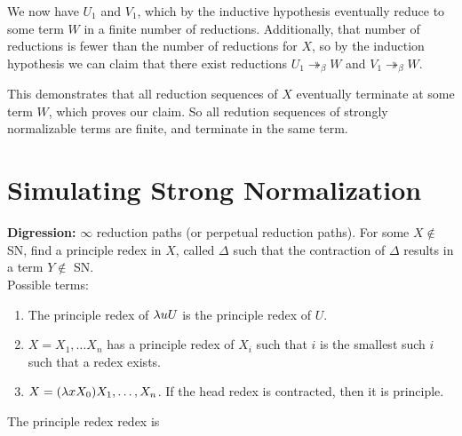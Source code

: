We now have $U_1$ and $V_1$, which by the inductive hypothesis eventually reduce to some term $W$ in a finite number of reductions. Additionally, that number of reductions is fewer than the number of reductions for $X$, so by the induction hypothesis we can claim that there exist reductions $U_1 \twoheadrightarrow_\beta W$ and $V_1 \twoheadrightarrow_\beta W$.

\begin{center}
\end{center}

This demonstrates that all reduction sequences of $X$ eventually terminate at some term $W$, which proves our claim. So all redution sequences of strongly normalizable terms are finite, and terminate in the same term.

\section{Simulating Strong Normalization}

\textbf{Digression:} $\infty$ reduction paths (or perpetual reduction paths). For some $X \not\in$ SN, find a principle redex in $X$, called $\Delta$ such that the contraction of $\Delta$ results in a term $Y \not\in$ SN.\\

Possible terms:
\begin{enumerate}
  \item The principle redex of $\lambda uU$ is the principle redex of $U$.
  \item $X = X_1,\ldots X_n$ has a principle redex of $X_i$ such that $i$ is the smallest such $i$ such that a redex exists.
  \item $X = (\lambda xX_0)X_1,\ldots,X_n$. If the head redex is contracted, then it is principle.
\end{enumerate}
The principle redex redex is

